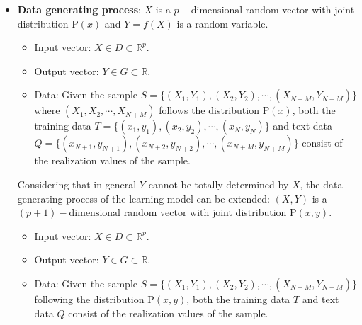 \documentclass{report}
\theoremstyle{nonumberplain}
\newcommand{\0}{\mathbf{0}}
\begin{document}
\begin{itemize}
	\item \textbf{Data generating process}: $X$ is a $p-\text{dimensional}$ random vector with joint distribution $\mathrm{P}(x)$ and $Y=f(X)$ is a random variable.
	\begin{itemize}
		\item Input vector: $X\in D\subset\mathbb{R}^p$.
		\item Output vector: $Y\in G\subset\mathbb{R}$.
		\item Data: Given the sample $S=\{(X_1,Y_1),(X_2,Y_2),\cdots,(X_{N+M},Y_{N+M})\}$ where $(X_1,X_2,\cdots,X_{N+M})$ follows the distribution $\mathrm{P}(x)$, both the training data $T=\{(x_1,y_1),(x_2,y_2),\cdots,(x_{N},y_{N})\}$ and text data $Q=\{(x_{N+1},y_{N+1}),(x_{N+2},y_{N+2}),\cdots,(x_{N+M},y_{N+M})\}$ consist of the realization values of the sample.
	\end{itemize}	

	Considering that in general $Y$ cannot be totally determined by $X$, the data generating process of the learning model can be extended: $(X,Y)$ is a $(p+1)-\text{dimensional}$ random vector with joint distribution $\mathrm{P}(x,y)$.
	\begin{itemize}
		\item Input vector: $X\in D\subset\mathbb{R}^p$.
		\item Output vector: $Y\in G\subset\mathbb{R}$.
		\item Data: Given the sample $S=\{(X_1,Y_1),(X_2,Y_2),\cdots,(X_{N+M},Y_{N+M})\}$ following the distribution $\mathrm{P}(x,y)$, both the training data $T$ and text data $Q$ consist of the realization values of the sample.
	\end{itemize}


\end{itemize}
\end{document}
